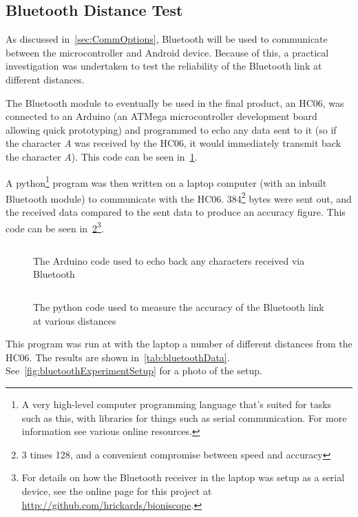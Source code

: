 \subsection{Bluetooth Distance Test}

As discussed in~\cref{sec:CommOptions}, Bluetooth will be used to communicate
between the microcontroller and Android device. Because of this, a practical
investigation was undertaken to test the reliability of the Bluetooth link at
different distances.

The Bluetooth module to eventually be used in the final product, an HC06, was
connected to an Arduino (an ATMega microcontroller development board allowing
quick prototyping) and programmed to echo any data sent to it (so if the
character \textit{A} was received by the HC06, it would immediately transmit
back the character \textit{A}). This code can be seen
in~\cref{lst:bluetoothDistanceTestArduino}.

A python\footnote{A very high-level computer programming language that's suited
  for tasks such as this, with libraries for things such as serial
communication. For more information see various online resources.} program was
then written on a laptop computer (with an inbuilt Bluetooth module) to
communicate with the HC06. 384\footnote{3 times 128, and a convenient compromise
between speed and accuracy} bytes were sent out, and the received data compared
to the sent data to produce an accuracy figure. This code can be seen
in~\cref{lst:bluetoothDistanceTestPython}\footnote{For details on how the
  Bluetooth receiver in the laptop was setup as a serial device, see the online
page for this project at \url{http://github.com/hrickards/bioniscope}.}.

\begin{figure}
  \inputminted{c}{code/bluetooth.ino}
  \caption[Bluetooth experiment Arduino code]{The Arduino code used to echo back any characters received via
  Bluetooth}
  \label{lst:bluetoothDistanceTestArduino}
\end{figure}

\begin{figure}
  \inputminted{python}{code/bluetooth.py}
  \caption[Bluetooth experiment python code]{The python code used to measure the accuracy of the Bluetooth link at various distances}
  \label{lst:bluetoothDistanceTestPython}
\end{figure}

This program was run at with the laptop a number of different distances from the
HC06. The results are shown in~\cref{tab:bluetoothData}.
See~\cref{fig:bluetoothExperimentSetup} for a photo of the setup.

